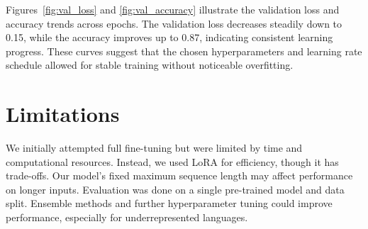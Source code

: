 \documentclass[11pt]{article}
\begin{document}
Figures~\ref{fig:val_loss} and \ref{fig:val_accuracy} illustrate the validation loss and accuracy trends across epochs. The validation loss decreases steadily down to 0.15, while the accuracy improves up to 0.87, indicating consistent learning progress. These curves suggest that the chosen hyperparameters and learning rate schedule allowed for stable training without noticeable overfitting.

\section*{Limitations}

We initially attempted full fine-tuning but were limited by time and computational resources. Instead, we used LoRA for efficiency, though it has trade-offs. Our model's fixed maximum sequence length may affect performance on longer inputs. Evaluation was done on a single pre-trained model and data split. Ensemble methods and further hyperparameter tuning could improve performance, especially for underrepresented languages.


\end{document}
